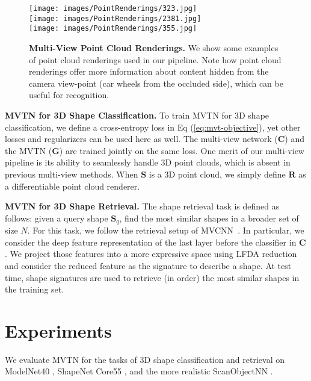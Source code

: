 \documentclass[10pt,twocolumn,letterpaper]{article}
\newcommand{\eqLabel}[1]{{Eq (#1)}}
\newcommand{\mysection}[1]{\noindent\textbf{#1.}}
\begin{document}
\begin{figure}[t]
    \centering
    \texttt{[image: images/PointRenderings/323.jpg]}\\
    \texttt{[image: images/PointRenderings/2381.jpg]} \\
    \texttt{[image: images/PointRenderings/355.jpg]}
    \caption{\textbf{Multi-View Point Cloud Renderings.} We show some examples of point cloud renderings used in our pipeline. Note how point cloud renderings offer more information about content hidden from the camera view-point (\eg car wheels from the occluded side), which can be useful for recognition.}
    \label{fig:point-rendring}
\end{figure}
\mysection{MVTN for 3D Shape Classification} \label{sec:mmtd-cls}
To train MVTN for 3D shape classification, 
we define a cross-entropy loss in \eqLabel{\ref{eq:mvt-objective}},
yet other losses and regularizers can be used here as well. The multi-view network ($\mathbf{C}$) and the MVTN ($\mathbf{G}$) are trained jointly on the same loss. 
One merit of our multi-view pipeline is its ability to seamlessly handle 3D point clouds, which is absent in previous multi-view methods. When $\mathbf{S}$ is a 3D point cloud, we simply define $\mathbf{R}$ as a differentiable point cloud renderer.

\vspace{1pt}\mysection{MVTN for 3D Shape Retrieval} \label{sec:mmtd-retr}
The shape retrieval task is defined as follows: given a query shape $\mathbf{S}_q$, find the most similar shapes in a broader set of size $N$.
For this task, we follow the retrieval setup of MVCNN~\cite{mvcnn}. In particular, we consider the deep feature representation of the last layer before the classifier in $\mathbf{C}$. We project those features into a more expressive space using LFDA reduction \cite{sugiyama2007dimensionality} and consider the reduced feature as the signature to describe a shape. At test time, shape signatures are used to retrieve (in order) the most similar shapes in the training set.




\section{Experiments} \label{sec:experiments}
We evaluate MVTN for the tasks of 3D shape classification and retrieval on  ModelNet40 \cite{modelnet}, ShapeNet Core55 \cite{shapenet}, and the more realistic ScanObjectNN \cite{scanobjectnn}.
\end{document}

